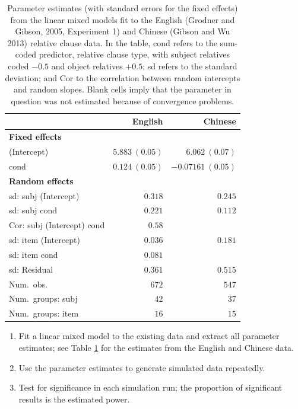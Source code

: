 \documentclass{ar-1col}\usepackage[]{graphicx}\usepackage[]{color}
\begin{document}
\begin{table}[h]
\caption{Parameter estimates (with standard errors for the fixed effects)  from the linear mixed models fit to the English (Grodner and Gibson, 2005, Experiment 1) and Chinese (Gibson and Wu 2013) relative clause data. In the table, cond refers to the sum-coded  predictor, relative clause type, with subject relatives coded $-0.5$ and object relatives $+0.5$; sd refers to the standard deviation; and Cor to the correlation between random intercepts and random slopes. Blank cells imply that the parameter in question was not estimated because of convergence problems.}
\label{table:coefficients}
\begin{center}
\begin{tabular}{@{}|l|r|r|@{}}
\hline
 & English & Chinese \\
\hline
\textbf{Fixed effects} & & \\
(Intercept)                & $5.883~(0.05)$   & $6.062~(0.07)$ \\
cond                       & $0.124~(0.05)$   & $-0.07161~(0.05)$      \\
\hline
\textbf{Random effects} & & \\
sd: subj (Intercept)      & $0.318$       & $0.245$       \\
sd: subj cond             & $0.221$       & $0.112$           \\
Cor: subj (Intercept) cond & $0.58$       &            \\
sd: item (Intercept)      & $0.036$       & $0.181$       \\
sd: item cond      & $0.081$       &        \\
sd: Residual              & $0.361$       & $0.515$       \\
\hline
Num.\ obs.                  & $672$        & $547$        \\
Num.\ groups: subj          & $42$         & $37$         \\
Num.\ groups: item          & $16$         & $15$         \\
\hline
\end{tabular}
\end{center}
\end{table}


\begin{enumerate}
\item Fit a linear mixed model to the existing data and extract all parameter estimates; see Table \ref{table:coefficients} for the estimates from the English and Chinese data.
\item Use the parameter estimates  to generate simulated data repeatedly.
\item Test for significance in each simulation run; the proportion of significant results is the estimated power.
\end{enumerate}
\end{document}
